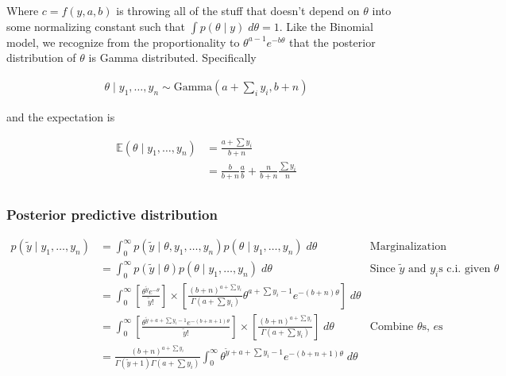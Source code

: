 \documentclass[
]{article}
\begin{document}
Where \(c = f(y, a, b)\) is throwing all of the stuff that doesn't
depend on \(\theta\) into some normalizing constant such that
\(\int p(\theta \mid y) \; d\theta = 1\). Like the Binomial model, we
recognize from the proportionality to \(\theta^{a - 1} e^{-b \theta}\)
that the posterior distribution of \(\theta\) is Gamma distributed.
Specifically

\begin{align}
\theta \mid y_1, \dots, y_n \sim \text{Gamma}(a + \sum_i y_i, b + n)
\end{align}

and the expectation is

\begin{align}
\mathbb{E}(\theta \mid y_1, \dots, y_n) &= \frac{a + \sum y_i}{b + n} \\
&= \frac{b}{b + n} \frac{a}{b} + \frac{n}{b + n}\frac{\sum y_i}{n} \\
\end{align}

\hypertarget{posterior-predictive-distribution}{%
\subsubsection{Posterior predictive
distribution}\label{posterior-predictive-distribution}}

\begin{align}
p(\tilde{y} \mid y_1, \dots, y_n) &= \int_0^{\infty} p(\tilde{y} \mid \theta, y_1, \dots, y_n) p(\theta \mid y_1, \dots, y_n) \; d\theta & \text{Marginalization} \\
&= \int_0^{\infty} p(\tilde{y} \mid \theta) p(\theta \mid y_1, \dots, y_n) \; d\theta & \text{Since $\tilde{y}$ and $y_i$s c.i. given $\theta$} \\
&= \int_0^{\infty} \left[ \frac{\theta^{\tilde{y}} e^{-\theta}}{\tilde{y}!} \right] \times \left[ \frac{(b + n)^{a + \sum y_i}}{\Gamma(a + \sum y_i)} \theta^{a + \sum y_i - 1} e^{-(b + n)\theta} \right] \; d\theta \\
&= \int_0^{\infty} \left[ \frac{\theta^{\tilde{y} + a + \sum y_i - 1} e^{-(b + n + 1)\theta}}{\tilde{y}!} \right] \times \left[ \frac{(b + n)^{a + \sum y_i}}{\Gamma(a + \sum y_i)} \right] \; d\theta & \text{Combine $\theta$s, $e$s} \\
&= \frac{(b + n)^{a + \sum y_i}}{\Gamma(\tilde{y} + 1) \Gamma(a + \sum y_i)} \int_0^{\infty} \theta^{\tilde{y} + a + \sum y_i - 1} e^{-(b + n + 1)\theta} \; d\theta \\
\end{align}
\end{document}
